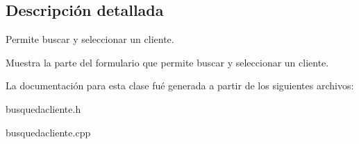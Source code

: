 \subsection{Descripci\'{o}n detallada}
Permite buscar y seleccionar un cliente. 

Muestra la parte del formulario que permite buscar y seleccionar un cliente. 



La documentaci\'{o}n para esta clase fu\'{e} generada a partir de los siguientes archivos:\begin{CompactItemize}
\item 
busquedacliente.h\item 
busquedacliente.cpp\end{CompactItemize}
